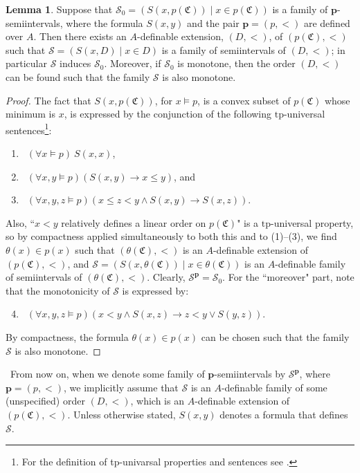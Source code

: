 \documentclass{amsart}
\theoremstyle{definition}
\newtheorem{Lemma}[Theorem]{Lemma}
\theoremstyle{definition}
\newcommand{\Mon}{\mathfrak C}
\newcommand{\tp}{\mathrm{tp}}
\def\pp{\mathbf{p}}
\def\lif{\rightarrow}
\begin{document}
\begin{Lemma}\label{Lemma_new_defextof_seminiterval}
Suppose that $\mathcal S_0=(S(x,p(\Mon))\mid x\in p(\Mon))$ is a family of $\mathbf p$-semiintervals, where the formula $S(x,y)$ and the pair $\mathbf p=(p,<)$ are defined over $A$. Then there exists an $A$-definable extension, $(D,<)$, of $(p(\Mon),<)$ such that $\mathcal S= (S(x,D)\mid x\in D)$ is a family of semiintervals of $(D,<)$; in particular $\mathcal S$ induces $\mathcal S_0$. Moreover, if $\mathcal S_0$ is monotone, then the order $(D,<)$ can be found such that the family $\mathcal S$ is also monotone. 
\end{Lemma}
\begin{proof} 
The fact that $S(x,p(\Mon))$, for $x\models p$, is a convex subset of $p(\Mon)$ whose minimum is $x$, is expressed by the conjunction of the following $\tp$-universal sentences\footnote{For the definition of tp-univarsal properties and sentences see \cite[Subsection 2.1]{MTwqom1}.}:
\begin{enumerate}[\hspace{10pt}(1)]
    \item \ $(\forall x\models p)\ S(x,x)$,
    \item \ $(\forall x,y\models p)(S(x,y)\lif x\leqslant y)$, and
    \item \ $(\forall x,y,z\models p)(x\leqslant z<y\land S(x,y)\lif S(x,z))$.
\end{enumerate}
Also, ``$x<y$ relatively defines a linear order on $p(\Mon)$" is a $\tp$-universal property, so by compactness applied simultaneously to both this and to (1)--(3), we find $\theta(x)\in p(x)$ such that $(\theta(\Mon),<)$ is an $A$-definable extension of $(p(\Mon),<)$, and $\mathcal S=(S(x,\theta(\Mon))\mid x\in\theta(\Mon))$ is an $A$-definable family of semiintervals of $(\theta(\Mon),<)$. Clearly, $\mathcal S^\pp=\mathcal S_0$.
For the ``moreover" part, note that the monotonicity of $\mathcal S$ is expressed by:
\begin{enumerate}[\hspace{10pt}(1)]\setcounter{enumi}{3}
    \item \ $(\forall x,y,z\models p)(x<y\land S(x,z)\lif z<y\lor S(y,z))$.
\end{enumerate}
By compactness, the formula $\theta(x)\in p(x)$ can be chosen such that the family $\mathcal S$ is also monotone.
\end{proof}
 
 \ From now on, when we denote some family of $\mathbf p$-semiintervals by $\mathcal S^{\mathbf p}$, where $\mathbf p=(p,<)$, we implicitly assume that $\mathcal S$ is an $A$-definable family of some (unspecified) order $(D,<)$, which is an $A$-definable extension of $(p(\Mon),<)$. Unless otherwise stated, $S(x,y)$ denotes a formula that defines $\mathcal S$. 
 
\end{document}
